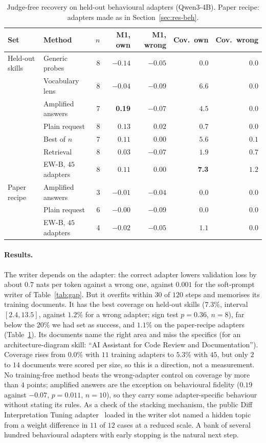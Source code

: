 \documentclass[11pt]{article}
\newcommand{\best}[1]{\textbf{#1}}
\newcommand{\EWB}{\textsc{EW-B}}
\begin{document}
\begin{table}[h]
\centering
\caption{Judge-free recovery on held-out behavioural adapters (Qwen3-4B). Paper recipe: adapters made as in Section~\ref{sec:res-beh}.}
\label{tab:ewbres}
\small
\setlength{\tabcolsep}{4pt}
\begin{tabular}{llrrrrr}
\toprule
Set & Method & $n$ & M1, own & M1, wrong & Cov.\ own & Cov.\ wrong\\
\midrule
Held-out skills & Generic probes & 8 & $-0.14$ & $-0.05$ & $0.0$ & $0.0$\\
 & Vocabulary lens & 8 & $-0.04$ & $-0.09$ & $6.6$ & $0.0$\\
 & Amplified answers & 7 & \best{0.19} & $-0.07$ & $4.5$ & $0.0$\\
 & Plain request & 8 & $0.13$ & $0.02$ & $0.7$ & $0.0$\\
 & Best of $n$ & 7 & $0.11$ & $0.00$ & $5.6$ & $0.1$\\
 & Retrieval & 8 & $0.03$ & $-0.07$ & $1.9$ & $0.7$\\
 & \EWB{}, $45$ adapters & 8 & $0.11$ & $0.00$ & \best{7.3} & $1.2$\\
\midrule
Paper recipe & Amplified answers & 3 & $-0.01$ & $-0.04$ & $0.0$ & $0.0$\\
 & Plain request & 6 & $-0.00$ & $-0.09$ & $0.0$ & $0.0$\\
 & \EWB{}, $45$ adapters & 4 & $-0.02$ & $-0.05$ & $1.1$ & $0.0$\\
\bottomrule
\end{tabular}
\end{table}

\paragraph{Results.} The writer depends on the adapter: the correct adapter lowers validation loss by about $0.7$ nats per token against a wrong one,
against $0.001$ for the soft-prompt writer of Table~\ref{tab:gap}. But it overfits within $30$ of $120$ steps and memorises its training documents.
It has the best coverage on held-out skills ($7.3\%$, interval $[2.4,13.5]$, against $1.2\%$ for a wrong adapter; sign test $p=0.36$, $n=8$), far below
the $20\%$ we had set as success, and $1.1\%$ on the paper-recipe adapters (Table~\ref{tab:ewbres}). Its documents name the right area and miss the
specifics (for an architecture-diagram skill: ``AI Assistant for Code Review and Documentation''). Coverage rises from $0.0\%$ with $11$ training adapters
to $5.3\%$ with $45$, but only $2$ to $14$ documents were scored per size, so this is a direction, not a measurement. No training-free method beats the
wrong-adapter control on coverage by more than $4$ points; amplified answers are the exception on behavioural fidelity ($0.19$ against $-0.07$,
$p=0.011$, $n=10$), so they carry some adapter-specific behaviour without stating its rules. As a check of the stacking mechanism, the public Diff
Interpretation Tuning adapter~\cite{dit} loaded in the writer slot named a hidden topic from a weight difference in $11$ of $12$ cases at a reduced scale.
A bank of several hundred behavioural adapters with early stopping is the natural next step.
\end{document}
